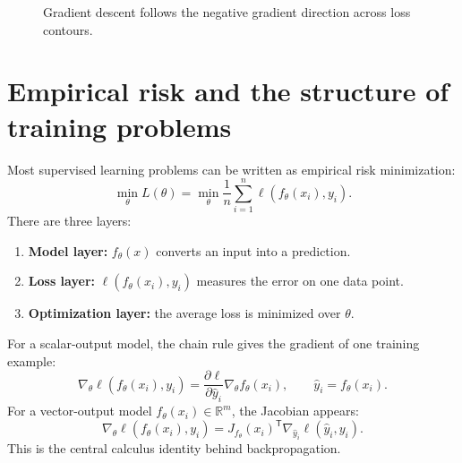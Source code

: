 \documentclass[11pt,oneside]{book}
\newcommand{\R}{\mathbb R}
\newcommand{\grad}{\nabla}
\newcommand{\T}{^{\mathsf T}}
\begin{document}
\begin{figure}[H]
\centering
{}
\caption{Gradient descent follows the negative gradient direction across loss contours.}
\end{figure}

\section{Empirical risk and the structure of training problems}

Most supervised learning problems can be written as empirical risk minimization:
\[
\min_\theta L(\theta)=\min_\theta \frac1n\sum_{i=1}^n\ell(f_\theta(x_i),y_i).
\]
There are three layers:
\begin{enumerate}
  \item \textbf{Model layer:} $f_\theta(x)$ converts an input into a prediction.
  \item \textbf{Loss layer:} $\ell(f_\theta(x_i),y_i)$ measures the error on one data point.
  \item \textbf{Optimization layer:} the average loss is minimized over $\theta$.
\end{enumerate}

For a scalar-output model, the chain rule gives the gradient of one training example:
\[
\grad_\theta\ell(f_\theta(x_i),y_i)
=\frac{\partial\ell}{\partial \widehat y_i}\grad_\theta f_\theta(x_i),
\qquad \widehat y_i=f_\theta(x_i).
\]
For a vector-output model $f_\theta(x_i)\in\R^m$, the Jacobian appears:
\[
\grad_\theta\ell(f_\theta(x_i),y_i)
=J_{f_\theta}(x_i)\T\grad_{\widehat y_i}\ell(\widehat y_i,y_i).
\]
This is the central calculus identity behind backpropagation.
\end{document}
